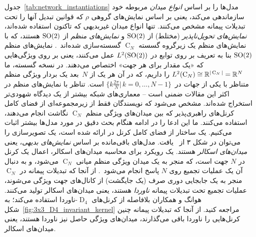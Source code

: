 جدول~\ref{tab:network_instantiations} مدل‌ها را بر اساس \emph{انواع میدان} مربوطه خود سازماندهی می‌کند، یعنی بر اساس نمایش‌های گروهی $\rho$ که قوانین تبدیل آنها را تحت تبدیلات پیمانه مشخص می‌کنند.
تنها انواع میدان غیربدیهی که تاکنون استفاده شده‌اند، \emph{نمایش‌های تحویل‌ناپذیر} (مختلط) از $\operatorname{SO}(2)$ \cite{Wiersma2020} و \emph{نمایش‌های منظم} از $\operatorname{SO}(2)$ هستند، که با نمایش‌های منظم یک زیرگروه گسسته $\operatorname{C}_N$ گسسته‌سازی شده‌اند~\cite{poulenard2018multi,sun2018zernet,deHaan2020meshCNNs,Yang2020parallelFrameCNN}.
نمایش‌های منظم $\operatorname{SO}(2)$ بنا به تعریف بر روی توابع در $L^2(\operatorname{SO}(2))$ عمل می‌کنند، یعنی بر روی ویژگی‌هایی که «یک مقدار برای هر جهت» اختصاص می‌دهند.
در نسخه گسسته، ما $L^2(\operatorname{C}_N) \cong \mathbb{R}^{|\operatorname{C}_N|} = \mathbb{R}^N$ را داریم، که در آن هر یک از $N$~بعد یک بردار ویژگی منظم متناظر با یکی از جهات در~$\big\{ k\frac{2\pi}{N} \big|\, k=0,\dots,N-1 \big\}$ است.
تناظر با نمایش‌های منظم در اکثر این مقالات ضمنی است -- معماری‌های شبکه بیشتر از یک دیدگاه شهودی‌تر استخراج شده‌اند.
مشخص می‌شود که نویسندگان فقط از زیرمجموعه‌ای از فضای کامل کرنل‌های راهبری‌پذیر که بین میدان‌های ویژگی منظم $\operatorname{C}_N$ نگاشت انجام می‌دهند، استفاده می‌کنند.
ما این ادعا را در ادامه هنگام بحث دقیق در مورد مدل‌ها بیشتر اثبات می‌کنیم.
یک ساختار از فضای کامل کرنل در \cite{Weiler2019_E2CNN} ارائه شده است، یک تصویرسازی را می‌توان در شکل ۳ از~\cite{Weiler2018SFCNN} یافت.
مدل‌های باقی‌مانده بر اساس \emph{نمایش‌های بدیهی}، یعنی \emph{میدان‌های اسکالر} هستند.
یک رویکرد برای محاسبه میدان‌های اسکالر، اعمال یک کرنل در $N$ جهت است، که منجر به یک میدان ویژگی منظم میانی $\operatorname{C}_N$ می‌شود، و به دنبال آن یک عملیات تجمیع روی $N$ پاسخ انجام می‌شود~\cite{masci2015geodesic,monti2017geometric,sun2018zernet}.
از آنجا که تبدیلات پیمانه در $\operatorname{C}_N$ منجر به یک جابجایی دوری صرف (یک جایگشت) از کانال‌های جهت ویژگی می‌شوند، عملیات تجمیع تحت تبدیلات پیمانه \emph{ناوردا} هستند، یعنی میدان‌های اسکالر تولید می‌کنند.
هوانگ و همکاران\cite{huang2019texturenet} بلافاصله از کرنل‌های $\operatorname{D}_4$-ناوردا استفاده می‌کند؛ به شکل~\ref{fig:3x3_D4_invariant_kernel} مراجعه کنید.
از آنجا که تبدیلات پیمانه چنین کرنل‌هایی را ناوردا باقی می‌گذارند، میدان‌های ویژگی حاصل نیز ناوردا هستند، یعنی میدان‌های اسکالر.


